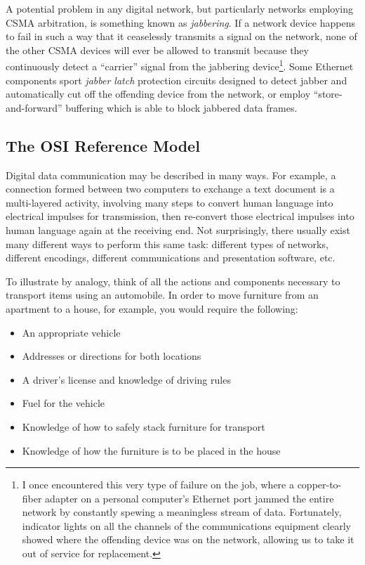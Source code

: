 \vskip 10pt

A potential problem in any digital network, but particularly networks employing CSMA arbitration, is something known as \textit{jabbering}.  If a network device happens to fail in such a way that it ceaselessly transmits a signal on the network, none of the other CSMA devices will ever be allowed to transmit because they continuously detect a ``carrier'' signal from the jabbering device\footnote{I once encountered this very type of failure on the job, where a copper-to-fiber adapter on a personal computer's Ethernet port jammed the entire network by constantly spewing a meaningless stream of data.  Fortunately, indicator lights on all the channels of the communications equipment clearly showed where the offending device was on the network, allowing us to take it out of service for replacement.}.  Some Ethernet components sport \textit{jabber latch} protection circuits designed to detect jabber and automatically cut off the offending device from the network, or employ ``store-and-forward'' buffering which is able to block jabbered data frames.      








\filbreak
\subsection{The OSI Reference Model}

Digital data communication may be described in many ways.  For example, a connection formed between two computers to exchange a text document is a multi-layered activity, involving many steps to convert human language into electrical impulses for transmission, then re-convert those electrical impulses into human language again at the receiving end.  Not surprisingly, there usually exist many different ways to perform this same task: different types of networks, different encodings, different communications and presentation software, etc.

To illustrate by analogy, think of all the actions and components necessary to transport items using an automobile.  In order to move furniture from an apartment to a house, for example, you would require the following:

\begin{itemize}
\item An appropriate vehicle
\item Addresses or directions for both locations
\item A driver's license and knowledge of driving rules
\item Fuel for the vehicle
\item Knowledge of how to safely stack furniture for transport
\item Knowledge of how the furniture is to be placed in the house
\end{itemize}

